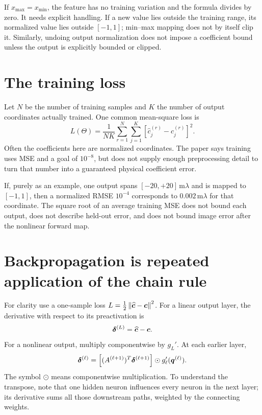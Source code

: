 If $x_{\max}=x_{\min}$, the feature has no training variation and the
formula divides by zero. It needs explicit handling.
If a new value lies outside the training range, its normalized value
lies outside $[-1,1]$; min--max mapping does not by itself clip it.
Similarly, undoing output normalization does not impose a coefficient
bound unless the output is explicitly bounded or clipped.

\section{The training loss}
Let $N$ be the number of training samples and $K$ the number of output
coordinates actually trained. One common mean-square loss is
\begin{equation}
L(\Theta)=\frac{1}{NK}\sum_{r=1}^N\sum_{j=1}^K
\left[\widehat c_j^{(r)}-c_j^{(r)}\right]^2.
\label{eq:trainingMSE}
\end{equation}
Often the coefficients here are normalized coordinates.
The paper says training uses MSE and a goal of $10^{-8}$, but does not
supply enough preprocessing detail to turn that number into a guaranteed
physical coefficient error.

If, purely as an example, one output spans
$[-20,+20]\,\mathrm{m}\lambda$ and is mapped to $[-1,1]$, then
a normalized RMSE $10^{-4}$ corresponds to
$0.002\,\mathrm{m}\lambda$ for that coordinate.
The square root of an average training MSE does not bound each output,
does not describe held-out error, and does not bound image error after
the nonlinear forward map.

\section{Backpropagation is repeated application of the chain rule}
For clarity use a one-sample loss
$L=\tfrac12\left\lVert\widehat{\bm{c}}-\bm{c}\right\rVert^2$.
For a linear output layer, the derivative with respect to its preactivation is
\[
\bm{\delta}^{(L)}=\widehat{\bm{c}}-\bm{c}.
\]
For a nonlinear output, multiply componentwise by $g_L'$.
At each earlier layer,
\begin{equation}
\bm{\delta}^{(\ell)}
=\left[(A^{(\ell+1)})^T\bm{\delta}^{(\ell+1)}\right]
\odot g_\ell'(\bm{q}^{(\ell)}).
\label{eq:backprop}
\end{equation}
The symbol $\odot$ means componentwise multiplication.
To understand the transpose, note that one hidden neuron influences
every neuron in the next layer; its derivative sums all those downstream
paths, weighted by the connecting weights.

